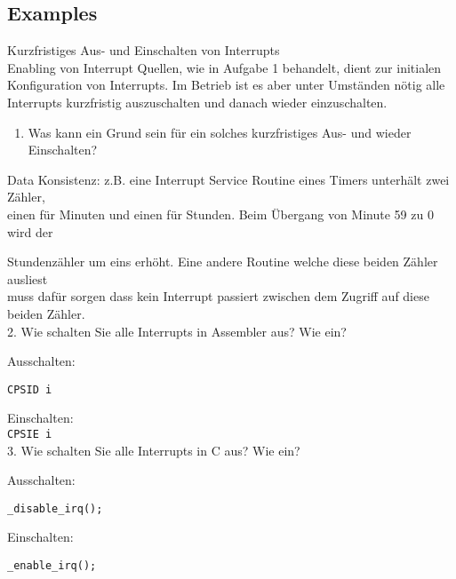 \subsection{Examples}












\begin{example2}{Kurzfristiges Aus- und Einschalten von Interrupts}\\
Enabling von Interrupt Quellen, wie in Aufgabe 1 behandelt, dient zur initialen Konfiguration von Interrupts. Im Betrieb ist es aber unter Umständen nötig alle Interrupts kurzfristig auszuschalten und danach wieder einzuschalten.

\begin{enumerate}
  \item Was kann ein Grund sein für ein solches kurzfristiges Aus- und wieder Einschalten?
\end{enumerate}

Data Konsistenz: z.B. eine Interrupt Service Routine eines Timers unterhält zwei Zähler,\\
einen für Minuten und einen für Stunden. Beim Übergang von Minute 59 zu 0 wird der

Stundenzähler um eins erhöht. Eine andere Routine welche diese beiden Zähler ausliest\\
muss dafür sorgen dass kein Interrupt passiert zwischen dem Zugriff auf diese beiden Zähler.\\

2. Wie schalten Sie alle Interrupts in Assembler aus? Wie ein?

Ausschalten:


\texttt{CPSID i}


Einschalten:\\
\texttt{CPSIE i}\\

3. Wie schalten Sie alle Interrupts in C aus? Wie ein?

Ausschalten:

\texttt{\_disable\_irq();}

Einschalten:

\texttt{\_enable\_irq();}

\end{example2}

